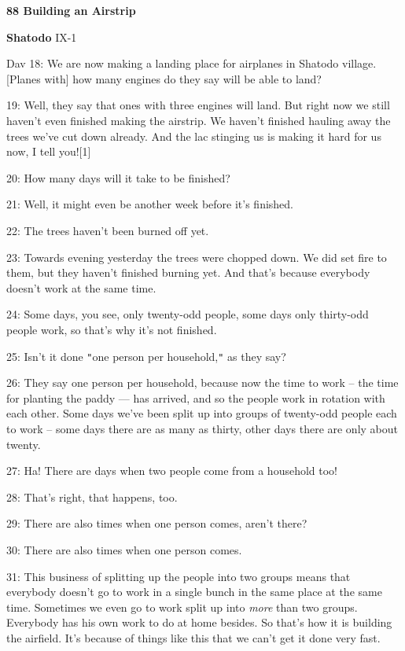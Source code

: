 
{\textbf{88 Building an Airstrip }}

{\textbf{Shatodo}}{ IX-1}

{Dav 18: We are now making a landing place for airplanes in Shatodo village.
[Planes with] how many engines do they say will be able to land?        }

{19: Well, they say that ones with three engines will land. But right now
we still haven't even finished making the airstrip. We haven't finished hauling
away the trees we've cut down already. And the lac stinging us is making it hard
for us now, I tell you![1]}

{20: How many days will it take to be finished?}

{21: Well, it might even be another week before it's finished.}

{22: The trees haven't been burned off yet.}

{23: Towards evening yesterday the trees were chopped down. We did set fire
to them, but they haven't finished burning yet. And that's because everybody doesn't
work at the same time.}

{24: Some days, you see, only twenty-odd people, some days only thirty-odd
people work, so that's why it's not finished.}

{25: Isn't it done \texttt{"}one person per household,\texttt{"} as they
say?}

{26: They say one person per household, because now the time to work --
the time for planting the paddy --- has arrived, and so the people work in rotation
with each other. Some days we've been split up into groups of twenty-odd people
each to work -- some days there are as many as thirty, other days there are only
about twenty. }

{27: Ha! There are days when two people come from a household too! }

{28: That's right, that happens, too.}

{29: There are also times when one person comes, aren't there?}

{30: There are also times when one person comes.}

{31: This business of splitting up the people into two groups means that
everybody doesn't go to work in a single bunch in the same place at the same time.
Sometimes we even go to work split up into }{\textit{more}}{ than
two groups. Everybody has his own work to do at home besides. So that's how it
is building the airfield. It's because of things like this that we can't get it
done very fast.   }

